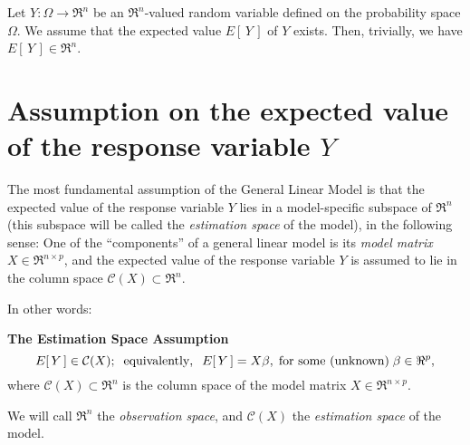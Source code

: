 \documentclass{article}
\begin{document}


\pagestyle{fancy}

%

\lfoot[]{}
\cfoot[]{}
\rfoot[]{\thepage}


\noindent
Let $Y : \Omega \longrightarrow \Re^{n}$ be an $\Re^{n}$-valued random variable defined on the probability space $\Omega$.  We assume that the expected value $E[\,Y\,]$ of $Y$ exists.  Then, trivially, we have $E[\,Y\,] \in \Re^{n}$.  

\section{Assumption on the expected value of the response variable $Y$}
\setcounter{theorem}{0}\setcounter{equation}{0}

The most fundamental assumption of the General Linear Model is that the expected value of the response variable $Y$ lies in a model-specific subspace of $\Re^{n}$ (this subspace will be called the \emph{estimation space} of the model), in the following sense:  One of the ``components'' of a general linear model is its \emph{model matrix} $X \in \Re^{n \times p}$, and the expected value of the response variable $Y$ is assumed to lie in the column space $\mathcal{C}(X) \subset \Re^{n}$.

\vskip 0.3cm
\noindent In other words:\vskip 0.1cm
\begin{center}
\begin{minipage}{16cm}
\noindent
\textbf{The Estimation Space Assumption}
\begin{equation}\label{StandardMultivariateLinearModel}
E[\,Y\,] \in \mathcal{C}(X);\;\;\textnormal{equivalently},\;\; E[\,Y\,] = X\beta,\; \textnormal{for some (unknown)}\; \beta \in \Re^{p},
\end{equation}
where $\mathcal{C}(X) \subset \Re^{n}$ is the column space of the model matrix $X \in \Re^{n \times p}$.
\end{minipage}
\end{center}

\vskip 0.25cm
\noindent
We will call $\Re^{n}$ the \emph{observation space}, and $\mathcal{C}(X)$ the \emph{estimation space} of the model.
\end{document}
